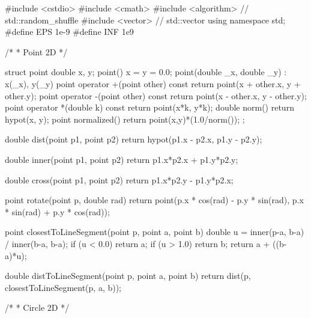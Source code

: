 \documentclass[11pt]{article}
\begin{document}
\begingroup\scriptsize
\begin{vncode}
#include <cstdio>
#include <cmath>
#include <algorithm>    // std::random_shuffle
#include <vector>       // std::vector
using namespace std;
#define EPS 1e-9
#define INF 1e9

/*
 * Point 2D
 */

struct point {
	double x, y;
	point() { x = y = 0.0; }
	point(double _x, double _y) : x(_x), y(_y) {}
	point operator +(point other) const{
		return point(x + other.x, y + other.y);
	}
	point operator -(point other) const{
		return point(x - other.x, y - other.y);
	}
	point operator *(double k) const{
		return point(x*k, y*k);
	}
	double norm() {
		return hypot(x, y);
	}
	point normalized() {
		return point(x,y)*(1.0/norm());
	}
};

double dist(point p1, point p2) {
	return hypot(p1.x - p2.x, p1.y - p2.y);
}

double inner(point p1, point p2) {
	return p1.x*p2.x + p1.y*p2.y;
}

double cross(point p1, point p2) {
	return p1.x*p2.y - p1.y*p2.x;
}

point rotate(point p, double rad) {
	return point(p.x * cos(rad) - p.y * sin(rad),
	p.x * sin(rad) + p.y * cos(rad));
}

point closestToLineSegment(point p, point a, point b) {
	double u = inner(p-a, b-a) / inner(b-a, b-a);
	if (u < 0.0) return a;
	if (u > 1.0) return b;
	return a + ((b-a)*u);
}

double distToLineSegment(point p, point a, point b) {
	return dist(p, closestToLineSegment(p, a, b));
}

/*
 * Circle 2D
 */


\end{vncode}
\end{document}
